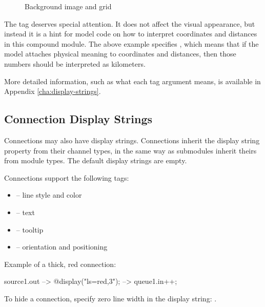\begin{figure}[htbp]
  \begin{center}
    \caption{Background image and grid}
    \label{fig:graphics-bgtags}
  \end{center}
\end{figure}

The  tag deserves special attention. It does not affect
the visual appearance, but instead it is a hint for model code
on how to interpret coordinates and distances in this compound
module. The above example specifies , which means
that if the model attaches physical meaning to coordinates and
distances, then those numbers should be interpreted as kilometers.

More detailed information, such as what each tag argument means, is
available in Appendix \ref{cha:display-strings}.


\subsection{Connection Display Strings}
\label{sec:graphics:connection-displaystrings}

Connections may also have display strings. Connections inherit the
display string property from their channel types, in the same way as
submodules inherit theirs from module types. The default display
strings are empty.

Connections support the following tags:
\begin{itemize}
  \item{ -- line style and color}
  \item{ -- text}
  \item{ -- tooltip}
  \item{ -- orientation and positioning}
\end{itemize}

Example of a thick, red connection:
\begin{ned}
source1.out --> { @display("ls=red,3"); } --> queue1.in++;
\end{ned}

\begin{center}
\end{center}

\begin{note}
To hide a connection, specify zero line width in the display string:
.
\end{note}

